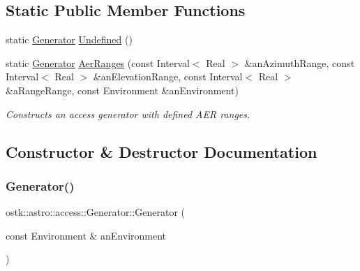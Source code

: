 \subsection*{Static Public Member Functions}
\begin{DoxyCompactItemize}
\item 
static \hyperlink{classostk_1_1astro_1_1access_1_1_generator}{Generator} \hyperlink{classostk_1_1astro_1_1access_1_1_generator_a1fb2dd3d88187da24482168337a23ade}{Undefined} ()
\item 
static \hyperlink{classostk_1_1astro_1_1access_1_1_generator}{Generator} \hyperlink{classostk_1_1astro_1_1access_1_1_generator_aececdcffcfea35feb07d9214752e6995}{Aer\+Ranges} (const Interval$<$ Real $>$ \&an\+Azimuth\+Range, const Interval$<$ Real $>$ \&an\+Elevation\+Range, const Interval$<$ Real $>$ \&a\+Range\+Range, const Environment \&an\+Environment)
\begin{DoxyCompactList}\small\item\em Constructs an access generator with defined A\+ER ranges. \end{DoxyCompactList}\end{DoxyCompactItemize}


\subsection{Constructor \& Destructor Documentation}
\mbox{\label{classostk_1_1astro_1_1access_1_1_generator_af609f21b3329033836220c55b75ab704}} 
\subsubsection{\texorpdfstring{Generator()}{Generator()}\hspace{0.1cm}{\footnotesize\ttfamily [1/2]}}
{\footnotesize\ttfamily ostk\+::astro\+::access\+::\+Generator\+::\+Generator (\begin{DoxyParamCaption}\item[{const Environment \&}]{an\+Environment }\end{DoxyParamCaption})}

\mbox{\label{classostk_1_1astro_1_1access_1_1_generator_a2b7303a186ca8c690c0769c5cae0c91e}} 
